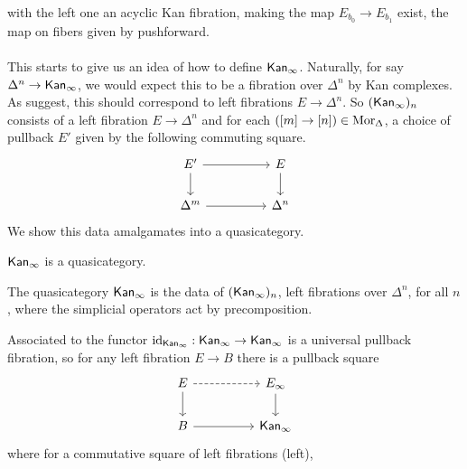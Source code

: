 with the left one an acyclic Kan fibration, making the map $E_{b_{0}}\to E_{b_{1}}$ exist, the map on fibers given by pushforward. 
\\\\
This starts to give us an idea of how to define $\Kan_{\infty}$. Naturally, for say $\Delta^{n}\to\mathsf{Kan}_{\infty}$, we would expect this to be a fibration over $\Delta^{n}$ by Kan complexes. As  suggest, this should correspond to left fibrations $E\to\Delta^{n}$. So $(\mathsf{Kan}_{\infty})_{n}$ consists of a left fibration $E\to\Delta^{n}$ and for each $([m]\to[n])\in\mathrm{Mor}_{\Updelta}$, a choice of pullback $E'$ given by the following commuting square. 
$$%
\begin{tikzcd}
	{E'} && E \\
	{\Delta^{m}} && {\Delta^{n}}
	\arrow[from=1-3, to=2-3]
	\arrow[from=1-1, to=2-1]
	\arrow[from=1-1, to=1-3]
	\arrow[from=2-1, to=2-3]
\end{tikzcd}$$
We show this data amalgamates into a quasicategory. 
\begin{theorem}\label{thm: Kan infinity is a quasicategory}
    $\Kan_{\infty}$ is a quasicategory. 
\end{theorem}
\begin{definition}[$\Kan_{\infty}$]
    The quasicategory $\Kan_{\infty}$ is the data of $(\mathsf{Kan}_{\infty})_{n}$, left fibrations over $\Delta^{n}$, for all $n$, where the simplicial operators act by precomposition. 
\end{definition}
Associated to the functor $\mathrm{id}_{\mathsf{Kan}_{\infty}}:\mathsf{Kan}_{\infty}\to\mathsf{Kan}_{\infty}$ is a universal pullback fibration, so for any left fibration $E\to B$ there is a pullback square 
$$%
\begin{tikzcd}
	E && {E_{\infty}} \\
	B && {\Kan_{\infty}}
	\arrow[dashed, from=1-1, to=1-3]
	\arrow[from=1-3, to=2-3]
	\arrow[from=1-1, to=2-1]
	\arrow[from=2-1, to=2-3]
\end{tikzcd}$$ where for a commutative square of left fibrations (left), 
